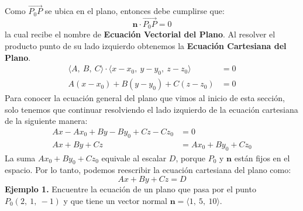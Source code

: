 \documentclass[12pt]{article}
\begin{document}
\begin{figure}[hbt!]
\centering


\end{figure}

Como $\overrightarrow{P_{0}P}$ se ubica en el plano, entonces debe cumplirse que:
\[
  \mathbf{n} \cdot \overrightarrow{P_{0}P} = 0
\]
la cual recibe el nombre de \textbf{Ecuación Vectorial del Plano}. Al resolver el producto punto de su lado izquierdo obtenemos la \textbf{Ecuación Cartesiana del Plano}.
\begin{align*}
  \langle A, \ B, \ C \rangle \cdot \langle x - x_{0}, \ y - y_{0}, \ z - z_{0} \rangle &= 0 \\
  A(x - x_{0}) + B(y - y_{0}) + C(z - z_{0}) &= 0
\end{align*}
Para conocer la ecuación general del plano que vimos al inicio de esta sección, solo tenemos que continuar resolviendo el lado izquierdo de la ecuación cartesiana de la siguiente manera:
\begin{align*}
  Ax - Ax_{0} + By - By_{0} + Cz - Cz_{0} &= 0 \\
  Ax + By + Cz &= Ax_{0} + By_{0} + Cz_{0}
\end{align*}
La suma $Ax_{0} + By_{0} + Cz_{0}$ equivale al escalar $D$, porque $P_{0}$ y $\mathbf{n}$ están fijos en el espacio. Por lo tanto, podemos reescribir la ecuación cartesiana del plano como:
\[
  Ax + By + Cz = D
\]
\textbf{Ejemplo 1.} Encuentre la ecuación de un plano que pasa por el punto $P_{0}(2, \ 1, \ -1)$ y que tiene un vector normal $\mathbf{n} = \langle 1, \ 5, \ 10 \rangle$.
\end{document}
